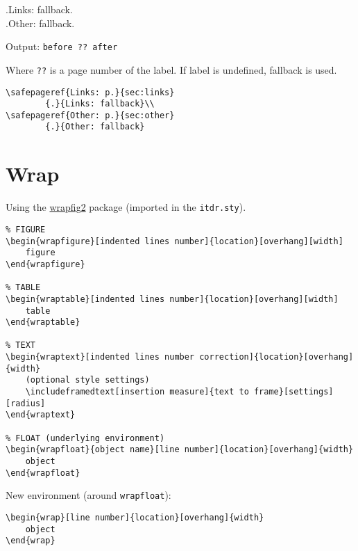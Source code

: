 \documentclass[itdr]{subfiles}
\begin{document}
	{.}{Links: fallback.}\\
	{.}{Other: fallback.}

Output: \lstinline!before ?? after!

Where \lstinline!??! is a page number of the label. If label is undefined, fallback is used.

\begin{lstlisting}
\safepageref{Links: p.}{sec:links}
		{.}{Links: fallback}\\
\safepageref{Other: p.}{sec:other}
		{.}{Other: fallback}
\end{lstlisting}

\vfill
\clearpage

\begin{minipage}{\textwidth}
\section{Wrap}

Using the \mbox{\href{https://www.ctan.org/pkg/wrapfig2}{wrapfig2}} package (imported in the \lstinline!itdr.sty!).

\begin{lstlisting}
% FIGURE
\begin{wrapfigure}[indented lines number]{location}[overhang][width]
	figure
\end{wrapfigure}

% TABLE
\begin{wraptable}[indented lines number]{location}[overhang][width]
	table
\end{wraptable}

% TEXT
\begin{wraptext}[indented lines number correction]{location}[overhang]{width}
	(optional style settings)
	\includeframedtext[insertion measure]{text to frame}[settings][radius]
\end{wraptext}

% FLOAT (underlying environment)
\begin{wrapfloat}{object name}[line number]{location}[overhang]{width}
	object
\end{wrapfloat}
\end{lstlisting}

New environment (around \lstinline!wrapfloat!):

\begin{lstlisting}
\begin{wrap}[line number]{location}[overhang]{width}
	object
\end{wrap}
\end{lstlisting}


\end{minipage}
\end{document}
